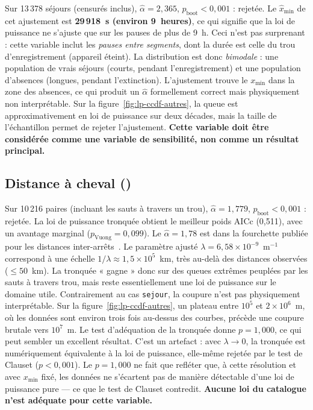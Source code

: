 \documentclass[12pt,a4paper]{report}
\theoremstyle{definition}
\DeclareRobustCommand{\code}[1]{\texorpdfstring{\texttt{\detokenize{#1}}}{\detokenize{#1}}}
\begin{document}
Sur 13\,378 séjours (censurés inclus), $\hat\alpha = 2{,}365$, $p_{\text{boot}} < 0{,}001$ :
rejetée. Le $\hat{x}_{\min}$ de cet ajustement est \textbf{29\,918~s (environ 9~heures)},
ce qui signifie que la loi de puissance ne s'ajuste que sur les pauses de plus de 9~h.
Ceci n'est pas surprenant : cette variable inclut les \emph{pauses entre segments}, dont
la durée est celle du trou d'enregistrement (appareil éteint). La distribution est donc
\emph{bimodale} : une population de vrais séjours (courts, pendant l'enregistrement) et
une population d'absences (longues, pendant l'extinction). L'ajustement trouve le
$x_{\min}$ dans la zone des absences, ce qui produit un $\hat\alpha$ formellement correct
mais physiquement non interprétable. Sur la figure~\ref{fig:lp-ccdf-autres}, la queue est
approximativement en loi de puissance sur deux décades, mais la taille de l'échantillon
permet de rejeter l'ajustement. \textbf{Cette variable doit être considérée comme une
variable de sensibilité, non comme un résultat principal.}

\subsection{Distance à cheval (\code{distance_a_cheval})}

Sur 10\,216 paires (incluant les sauts à travers un trou), $\hat\alpha = 1{,}779$,
$p_{\text{boot}} < 0{,}001$ : rejetée. La loi de puissance tronquée obtient le meilleur
poids AICc (0{,}511), avec un avantage marginal ($p_{\text{Vuong}} = 0{,}099$). Le
$\hat\alpha = 1{,}78$ est dans la fourchette publiée pour les distances
inter-arrêts~\cite{rhee2011,alessandretti2017}. Le paramètre ajusté
$\lambda = 6{,}58 \times 10^{-9}$~m$^{-1}$ correspond à une échelle
$1/\lambda \approx 1{,}5 \times 10^5$~km, très au-delà des distances observées
($\le 50$~km). La tronquée « gagne » donc sur des queues extrêmes peuplées par les sauts
à travers trou, mais reste essentiellement une loi de puissance sur le domaine utile.
Contrairement au cas \texttt{sejour}, la coupure n'est pas physiquement interprétable.
Sur la figure~\ref{fig:lp-ccdf-autres}, un plateau entre $10^5$ et $2 \times 10^6$~m, où
les données sont environ trois fois au-dessus des courbes, précède une coupure brutale
vers $10^7$~m. Le test d'adéquation de la tronquée donne $p=1{,}000$, ce qui peut sembler
un excellent résultat. C'est un artefact : avec $\lambda \to 0$, la tronquée est
numériquement équivalente à la loi de puissance, elle-même rejetée par le test de Clauset
($p<0{,}001$). Le $p=1{,}000$ ne fait que refléter que, à cette résolution et avec
$x_{\min}$ fixé, les données ne s'écartent pas de manière détectable d'une loi de
puissance pure — ce que le test de Clauset contredit. \textbf{Aucune loi du catalogue
n'est adéquate pour cette variable.}
\end{document}
